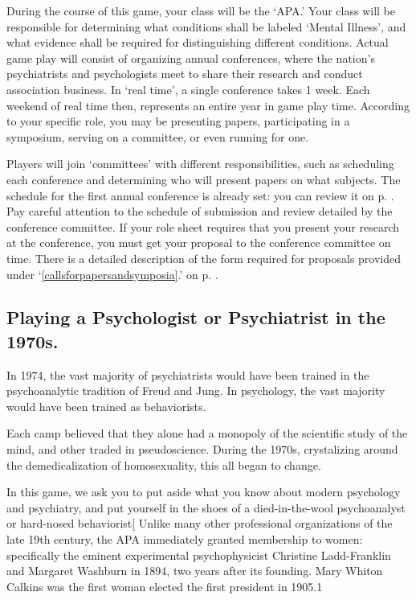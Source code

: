 During the course of this game, your class will be the ‘APA.’ Your class will be responsible for determining what conditions shall be labeled ‘Mental Illness’, and what evidence shall be required for distinguishing different conditions. Actual game play will consist of organizing annual conferences, where the nation's psychiatrists and psychologists meet to share their research and conduct association business. In `real time', a single conference takes 1 week. Each weekend of real time then, represents an entire year in game play time. According to your specific role, you may be presenting papers, participating in a symposium, serving on a committee, or even running for one.

Players will join ‘committees’ with different responsibilities, such as scheduling each conference and determining who will present papers on what subjects. The schedule for the first annual conference is already set: you can review it on p. \pageref{conferenceschedulefor1971} . Pay careful attention to the schedule of submission and review detailed by the conference committee. If your role sheet requires that you present your research at the conference, you must get your proposal to the conference committee on time. There is a detailed description of the form required for proposals provided under ‘\ref{callsforpapersandsymposia}.’ on p. \pageref{callsforpapersandsymposia}.

\subsection{Playing a Psychologist or Psychiatrist in the 1970s.}
\label{playingapsychologistorpsychiatristinthe1970s.}

In 1974, the vast majority of psychiatrists would have been trained in the psychoanalytic tradition of Freud and Jung. In psychology, the vast majority would have been trained as behaviorists.

Each camp believed that they alone had a monopoly of the scientific study of the mind, and other traded in pseudoscience. During the 1970s, crystalizing around the demedicalization of homosexuality, this all began to change. 

In this game, we ask you to put aside what you know about modern psychology and psychiatry, and put yourself in the shoes of a died-in-the-wool psychoanalyst or hard-nosed behaviorist[ Unlike many other professional organizations of the late 19th century, the APA immediately granted membership to women: specifically the eminent experimental psychophysicist Christine Ladd-Franklin and Margaret Washburn in 1894, two years after its founding. Mary Whiton Calkins was the first woman elected the first president in 1905.⁠1

